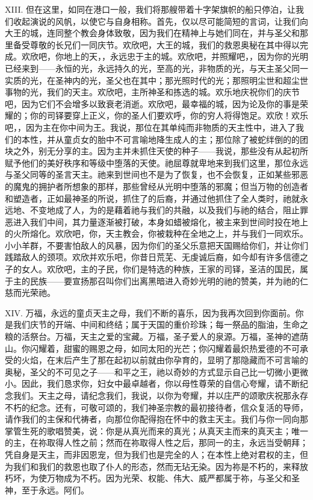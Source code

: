 XIII. 但在这里，如同在港口一般，我们将那艘带着十字架旗帜的船只停泊，让我们收起演说的风帆，以使它与自身相称。首先，仅以尽可能简短的言词，让我们向大王的城，连同整个教会身体致敬，因为我们在精神上与她们同在，并与圣父和那里备受尊敬的长兄们一同庆节。欢欣吧，大王的城，我们的救恩奥秘在其中得以完成。欢欣吧，你地上的天，，永远忠于主的城。欢欣吧，并照耀吧，，因为你的光明已经来到——永恒的光，永远持久的光，至高的光，非物质的光，与天主圣父同一实质的光，在圣神内的光，圣父也在其中；那光照时代的光；那照明尘世和超尘世事物的光，我们的天主。欢欣吧，主所神圣和拣选的城。欢乐地庆祝你们的庆节吧，因为它们不会增多以致衰老消逝。欢欣吧，最幸福的城，因为论及你的事是荣耀的；你的司铎要穿上正义，你的圣人们要欢呼，你的穷人将得饱足。欢欣！欢乐吧，，因为主在你中间为王。我说，那位在其单纯而非物质的天主性中，进入了我们的本性，并从童贞女的胎中不可言喻地降生成人的主；那位除了被蛇绊倒的的团块之外，别无分享的主。因为主并未抓住天使的种子——我说，那些没有从起初所赋予他们的美好秩序和等级中堕落的天使。祂屈尊就卑地来到我们这里，那位永远与圣父同等的圣言天主。祂来到世间也不是为了恢复，也不会恢复，正如某些邪恶的魔鬼的拥护者所想象的那样，那些曾经从光明中堕落的邪魔；但当万物的创造者和塑造者，正如最神圣的所说，抓住了的后裔，并通过他抓住了全人类时，祂就永远地、不变地成了人，为的是藉着祂与我们的共融，以及我们与祂的结合，阻止罪恶进入我们中间，其力量逐渐被打破，本身如蜡被熔化，被主来到世间时投在地上的火所熔化。欢欣吧，你，天主教会，你被栽种在全地之上，并与我们一同欢乐。小小羊群，不要害怕敌人的风暴，因为你们的圣父乐意把天国赐给你们，并让你们践踏敌人的颈项。欢欣并欢乐吧，你昔日荒芜、无虔诚后裔，如今却有许多信德之子的女人。欢欣吧，主的子民，你们是特选的种族，王家的司铎，圣洁的国民，属于主的民族——要宣扬那召叫你们出离黑暗进入奇妙光明的祂的赞美，并为祂的仁慈而光荣祂。\par

XIV. 万福，永远的童贞天主之母，我们不断的喜乐，因为我再次回到你面前。你是我们庆节的开端、中间和终结；属于天国的重价珍珠；每一祭品的脂油，生命之粮的活祭台。万福，天主之爱的宝藏。万福，圣子爱人的泉源。万福，圣神的遮荫山。你闪耀着，甜蜜的赐恩之母，如同太阳的光芒；你闪耀着最炽热爱德的不可承受的火焰，在末后产生了那在起初以前就由你孕育的，显明了那隐藏而不可言喻的奥秘，圣父的不可见之子——和平之王，祂以奇妙的方式显示自己比一切微小更微小。因此，我们恳求你，妇女中最卓越者，你以母性尊荣的自信心夸耀，请不断纪念我们。天主之母，请纪念我们，我说，以你为夸耀，并以庄严的颂歌庆祝那永存不朽的纪念。还有，可敬可颂的，我们神圣宗教的最初接待者，信众复活的导师，请作我们的主保和代祷者，向那位你配得抱在怀中的救主天主。我们与你一同向那掌管生死的歌唱赞美，说：你是从真光而来的真光；从真天主而来的真天主；唯一的主，在祢取得人性之前；然而在祢取得人性之后，那同一的主，永远当受朝拜；凭自身是天主，而非因恩宠，但为我们也是完全的人；在本性上绝对君权的主，但为我们和我们的救恩也取了仆人的形态，然而无玷无染。因为祢是不朽的，来释放朽坏，为使万物成为不朽。因为光荣、权能、伟大、威严都属于祢，与圣父和圣神，至于永远。阿们。\par

